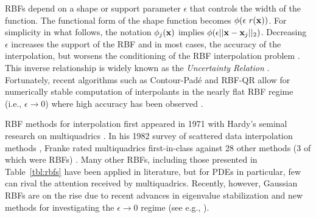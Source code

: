 \documentclass[11pt]{report}
\begin{document}
{RBFs depend on a shape or support parameter $\epsilon$ that controls the width of the function. The functional form of the shape function becomes $\phi(\epsilon\  r(\mathbf{x}))$. For simplicity in what follows, the notation $\phi_j(\mathbf{x})$ implies $\phi(\epsilon ||\mathbf{x}-\mathbf{x}_j||_2)$. Decreasing $\epsilon$ increases the support of the RBF and in most cases, the accuracy of the interpolation, but worsens the conditioning of the RBF interpolation problem \cite{Schaback1995}. This inverse relationship is widely known as the \emph{Uncertainty Relation} \cite{Schaback1995, Iske2004}. 
Fortunately, recent algorithms such as Contour-Pad\'{e} \cite{Fornberg2004} and RBF-QR \cite{Fornberg2007, Fornberg2011a} allow for numerically stable computation of interpolants in the nearly flat RBF regime (i.e., $\epsilon \rightarrow 0$) where high accuracy has been observed \cite{Larsson2003, Fornberg2008}. 










RBF methods for interpolation first appeared in 1971 with Hardy's seminal research on multiquadrics
\cite{Hardy1971}. In his 1982 survey of scattered data interpolation methods \cite{Franke1982}, Franke rated multiquadrics first-in-class against 28 other methods (3 of which were RBFs) \cite{Franke1982}. Many other RBFs, 
including those presented in Table~\ref{tbl:rbfs} have been applied in literature, but for PDEs in particular, few can rival the 
attention received by multiquadrics. Recently, however, Gaussian RBFs are on the rise due to recent advances in eigenvalue stabilization and new methods for investigating the $\epsilon \rightarrow 0$ regime (see e.g., \cite{FornbergLehto11,Fornberg2011a}). 


}
\end{document}
